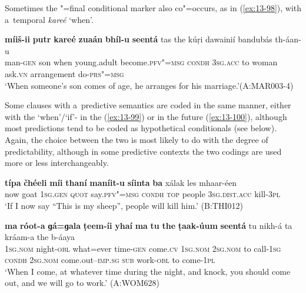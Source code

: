 Sometimes the "=final conditional marker also co"=occurs, as in (\ref{ex:13-98}), with a~temporal  \textit{kareé} `when'. 

\begin{exe}
\ex
\label{ex:13-98}
\gll \textbf{míiš-ii} \textbf{putr} \textbf{kareé} \textbf{zuaán} \textbf{bhíl-u} \textbf{seentá} tas the kúṛi dawainií bandubás th-áan-u\\
man-\textsc{gen} son when young.adult become.\textsc{pfv"=msg} \textsc{condh} \textsc{3sg.acc} to woman ask.\textsc{vn} arrangement do-\textsc{prs"=msg}  \\
\glt `When someone's son comes of age, he arranges for his marriage.'\newline (A:MAR003-4) 
\end{exe}

Some clauses with a~predictive semantics are coded in the same manner, either with the `when'/`if'- in the  (\ref{ex:13-99}) or in the future (\ref{ex:13-100}), although most predictions tend to be coded as hypothetical conditionals (see below). Again, the choice between the two is most likely to do with the degree of predictability, although in some predictive contexts the two codings are used more or less interchangeably.

\begin{exe}
\ex
\label{ex:13-99}
\gll \textbf{típa} \textbf{čhéeli} \textbf{míi} \textbf{thaní} \textbf{maníit-u} \textbf{síinta} \textbf{ba}  xálak les mhaar-éen\\
now goat \textsc{1sg.gen} \textsc{quot} say.\textsc{pfv"=msg} \textsc{condh} \textsc{top} people \textsc{3sg.dist.acc} kill-\textsc{3pl}\\
\glt `If I now say ``This is my sheep'', people will kill him.' (B:THI012)

\ex
\label{ex:13-100}
\gll \textbf{ma} \textbf{róot-a} \textbf{ɡá=ɡala} \textbf{ṭeem-íi} \textbf{yhaí} \textbf{ma} \textbf{tu} \textbf{the} \textbf{ṭaak-úum} \textbf{seentá} tu nikh-á ta kráam-a the b-áaya\\
\textsc{1sg.nom} night-\textsc{obl} what=ever time-\textsc{gen} come.\textsc{cv} \textsc{1sg.nom} \textsc{2sg.nom} to call-\textsc{1sg} \textsc{condh} \textsc{2sg.nom} come.out--\textsc{imp.sg} \textsc{sub} work-\textsc{obl} to come-\textsc{1pl}\\
\glt `When I come, at whatever time during the night, and knock, you should come out, and we will go to work.' (A:WOM628) 
\end{exe}

